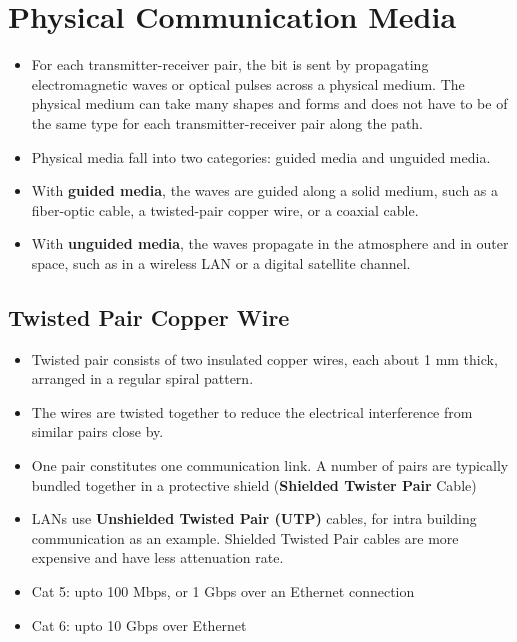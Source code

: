 \documentclass{article}
\theoremstyle{plain}
\theoremstyle{definition}
\begin{document}
\section{Physical Communication Media}

\begin{itemize}
    \item For each transmitter-receiver pair, the bit is sent by propagating electromagnetic waves or optical pulses across a physical medium. The physical medium can take many shapes and forms and does not have to be of the same type for each transmitter-receiver pair along the path.
    
    \item Physical media fall into two categories: guided media and unguided media.
    
    \item With \textbf{guided media}, the waves are guided along a solid medium, such as a fiber-optic cable, a twisted-pair copper wire, or a coaxial cable.
    
    \item With \textbf{unguided media}, the waves propagate in the atmosphere and in outer space, such as in a wireless LAN or a digital satellite channel.
\end{itemize}

\subsection{Twisted Pair Copper Wire}

\begin{itemize}
    \item Twisted pair consists of two insulated copper wires, each about 1 mm thick, arranged in a regular spiral pattern. 
    
    \item The wires are twisted together to reduce the electrical interference from similar pairs close by.
    
    \item One pair constitutes one communication link. A number of pairs are typically bundled together in a protective shield (\textbf{Shielded Twister Pair} Cable)
    
    \item LANs use \textbf{Unshielded Twisted Pair (UTP)} cables, for intra building communication as an example. Shielded Twisted Pair cables are more expensive and have less attenuation rate. 
    
    \item Cat 5: upto 100 Mbps, or 1 Gbps over an Ethernet connection
    
    \item Cat 6: upto 10 Gbps over Ethernet

\end{itemize}
\end{document}
